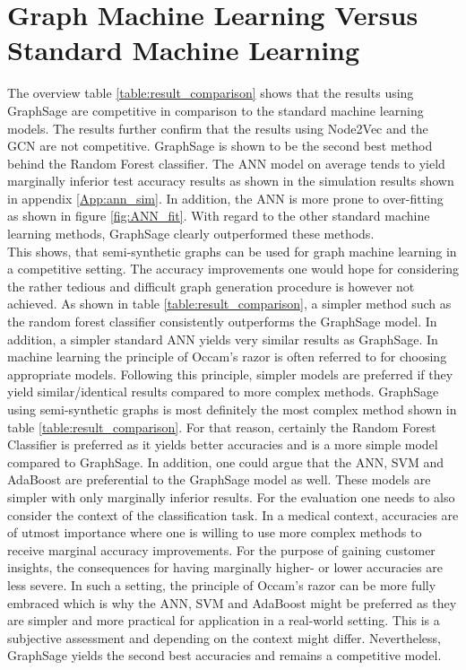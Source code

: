   \section{Graph Machine Learning Versus Standard Machine Learning}

  The overview table \ref{table:result_comparison} shows that the results using 
  GraphSage are competitive in comparison to the standard machine learning
  models. The results further confirm that the results using Node2Vec and the 
  GCN are not competitive. GraphSage is shown to be the second best method 
  behind the Random Forest classifier. The ANN model on average tends to yield 
  marginally inferior test accuracy results as shown in the simulation results 
  shown in appendix \ref{App:ann_sim}. In addition, the ANN is more prone to 
  over-fitting as shown in figure \ref{fig:ANN_fit}. With regard to the other 
  standard machine learning methods, GraphSage clearly outperformed these methods. \\

  \noindent This shows, that semi-synthetic graphs can be used for graph 
  machine learning in a competitive setting. The accuracy improvements one would 
  hope for considering the rather tedious and difficult graph generation 
  procedure is however not achieved. As shown in table 
  \ref{table:result_comparison}, a simpler method such as the random forest 
  classifier consistently outperforms the GraphSage model. In addition, a
  simpler standard ANN yields very similar results as GraphSage. In machine 
  learning the principle of Occam's razor is often referred to for choosing 
  appropriate models. Following this principle, simpler models are preferred if 
  they yield similar/identical results compared to more complex methods.
  GraphSage using semi-synthetic graphs is most definitely the most complex 
  method shown in table \ref{table:result_comparison}. For that reason, certainly 
  the Random Forest Classifier is preferred as it yields better accuracies and
  is a more simple model compared to GraphSage. In addition, one could argue
  that the ANN, SVM and AdaBoost are preferential to the GraphSage model as
  well. These models are simpler with only marginally inferior results. For
  the evaluation one needs to also consider the context of the classification
  task. In a medical context, accuracies are of utmost importance where one is
  willing to use more complex methods to receive marginal accuracy improvements. 
  For the purpose of gaining customer insights, the consequences for having
  marginally higher- or lower accuracies are less severe. In such a setting,
  the principle of Occam's razor can be more fully embraced which is why the
  ANN, SVM and AdaBoost might be preferred as they are simpler and more
  practical for application in a real-world setting. This is a subjective 
  assessment and depending on the context might differ. Nevertheless, GraphSage
  yields the second best accuracies and remains a competitive model.  





